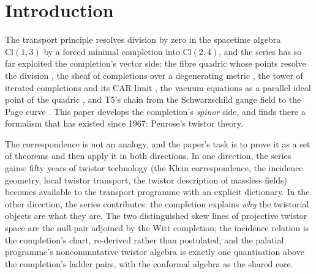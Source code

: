 \documentclass[11pt]{article}
\theoremstyle{definition}
\newcommand{\Cl}{\mathrm{Cl}}
\begin{document}
\newpage
\section{Introduction}\label{sec:intro}

The transport principle \cite{ButlerT1} resolves division by zero in the spacetime algebra $\Cl(1,3)$ by a forced minimal completion into $\Cl(2,4)$, and the series has so far exploited the completion's vector side: the fibre quadric whose points resolve the division \cite{ButlerT1}, the sheaf of completions over a degenerating metric \cite{ButlerT4}, the tower of iterated completions and its CAR limit \cite{ButlerT3}, the vacuum equations as a parallel ideal point of the quadric \cite{ButlerT6}, and T5's chain from the Schwarzschild gauge field to the Page curve \cite{ButlerT5}. This paper develops the completion's \emph{spinor} side, and finds there a formalism that has existed since 1967: Penrose's twistor theory.

The correspondence is not an analogy, and the paper's task is to prove it as a set of theorems and then apply it in both directions. In one direction, the series gains: fifty years of twistor technology (the Klein correspondence, the incidence geometry, local twistor transport, the twistor description of massless fields) becomes available to the transport programme with an explicit dictionary. In the other direction, the series contributes: the completion explains \emph{why} the twistorial objects are what they are. The two distinguished skew lines of projective twistor space are the null pair adjoined by the Witt completion; the incidence relation is the completion's chart, re-derived rather than postulated; and the palatial programme's noncommutative twistor algebra is exactly one quantisation above the completion's ladder pairs, with the conformal algebra as the shared core.
\end{document}
